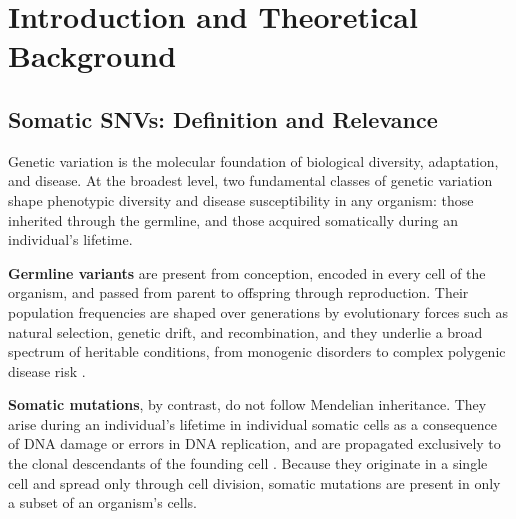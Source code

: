 

\chapter{Introduction and Theoretical Background} %
\label{Chapter1} %


\newcommand{\keyword}[1]{\textbf{#1}}
\newcommand{\tabhead}[1]{\textbf{#1}}
\newcommand{\code}[1]{\texttt{#1}}
\newcommand{\file}[1]{\texttt{\bfseries#1}}
\newcommand{\option}[1]{\texttt{\itshape#1}}

\section{Somatic SNVs: Definition and Relevance}

Genetic variation is the molecular foundation of biological diversity, adaptation, and disease. 
At the broadest level, two fundamental classes of genetic variation shape phenotypic diversity and disease susceptibility in any organism: those inherited through the germline, and those acquired somatically during an individual's lifetime.

\keyword{Germline variants} are present from conception, encoded in every cell of the organism, and passed from parent to offspring through reproduction. Their population frequencies are shaped over generations by evolutionary forces such as natural selection, genetic drift, and recombination, and they underlie a broad spectrum of heritable conditions, from monogenic disorders to complex polygenic disease risk \parencite{YuGeneticvariation2024}.

\keyword{Somatic mutations}, by contrast, do not follow Mendelian inheritance. 
They arise during an individual's lifetime in individual somatic cells as a consequence of DNA damage or errors in DNA replication, and are propagated exclusively to the clonal descendants of the founding cell \parencite{YuGeneticvariation2024}. Because they originate in a single cell and spread only through cell division, somatic mutations are present in only a subset of an organism's cells.

